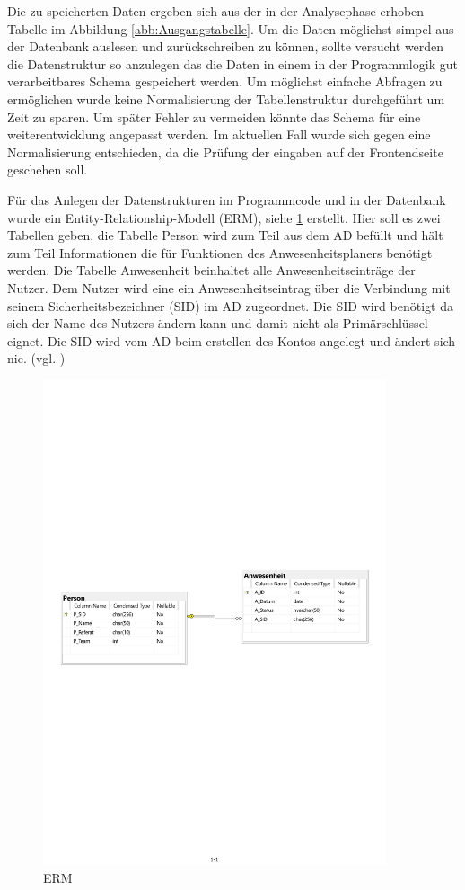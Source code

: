 Die zu speicherten Daten ergeben sich aus der in der Analysephase erhoben Tabelle im Abbildung \ref{abb:Ausgangstabelle}. Um die Daten möglichst simpel aus der Datenbank auslesen und zurückschreiben zu können, sollte versucht werden die Datenstruktur so anzulegen das die Daten in einem in der Programmlogik gut verarbeitbares Schema gespeichert werden. Um möglichst einfache Abfragen zu ermöglichen wurde keine Normalisierung der Tabellenstruktur durchgeführt um Zeit zu sparen. Um später Fehler zu vermeiden könnte das Schema für eine weiterentwicklung angepasst werden. Im aktuellen Fall wurde sich gegen eine Normalisierung entschieden, da die Prüfung der eingaben auf der Frontendseite geschehen soll.

Für das Anlegen der Datenstrukturen im Programmcode und in der Datenbank wurde ein Entity-Relationship-Modell (ERM), siehe \ref{abb:ERM} erstellt. Hier soll es zwei Tabellen geben, die Tabelle Person wird zum Teil aus dem AD befüllt und hält zum Teil Informationen die für Funktionen des Anwesenheitsplaners benötigt werden. Die Tabelle Anwesenheit beinhaltet alle Anwesenheitseinträge der Nutzer. Dem Nutzer wird eine ein Anwesenheitseintrag über die Verbindung mit seinem Sicherheitsbezeichner (SID) im AD zugeordnet. Die SID wird benötigt da sich der Name des Nutzers ändern kann und damit nicht als Primärschlüssel eignet. Die SID wird vom AD beim erstellen des Kontos angelegt und ändert sich nie. (vgl. \cite{sid})

\begin{figure}[htbp]
    \centering
    \includegraphics[width=0.9\textwidth,angle=0]{abb/ERM.pdf}
    \caption[Beschreibung]{ERM}
    \label{abb:ERM}
\end{figure}

